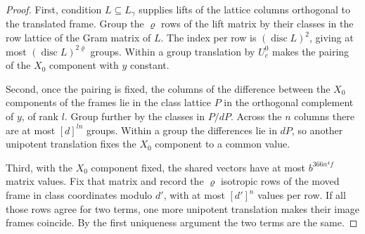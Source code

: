 \begin{proof}
First, condition $L\subseteq L_\gamma$ supplies lifts of the lattice columns orthogonal to the translated frame.
Group the $\varrho$ rows of the lift matrix by their classes in the row lattice of the Gram matrix of $L$.
The index per row is $(\operatorname{disc}L)^2$, giving at most $(\operatorname{disc}L)^{2\varrho}$ groups.
Within a group translation by $U_c^0$ makes the pairing of the $X_0$ component with $y$ constant.

Second, once the pairing is fixed, the columns of the difference between the $X_0$ components of the frames lie in
the class lattice $P$ in the orthogonal complement of $y$, of rank $l$.
Group further by the classes in $P/dP$. Across the $n$ columns there are at most $[d]^{ln}$ groups.
Within a group the differences lie in $dP$, so another unipotent translation fixes the $X_0$ component to a common value.

Third, with the $X_0$ component fixed, the shared vectors have at most $b^{366n^4 f}$ matrix values.
Fix that matrix and record the $\varrho$ isotropic rows of the moved frame in class coordinates modulo $d'$,
with at most $[d']^n$ values per row.
If all those rows agree for two terms, one more unipotent translation makes their image frames coincide.
By the first uniqueness argument the two terms are the same.


\end{proof}
